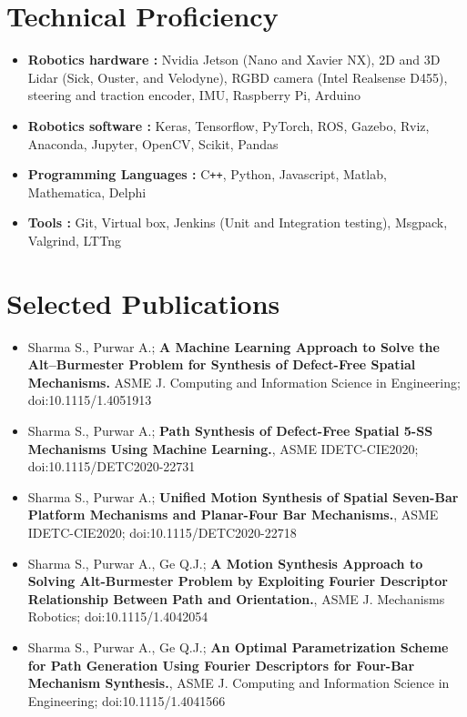 \documentclass[letterpaper,10pt]{article}
\newcommand{\resumeSection}[1]{
\vspace{-12pt}
\section{\textbf{#1}}
}
\newcommand{\resumeItemListStart}{
\vspace{-6pt}
\begin{itemize}[leftmargin=14pt]
}
\newcommand{\resumeItemListEnd}{
\vspace{+6pt}
\end{itemize}
}
\newcommand{\resumeItem}[1]{
  \item\small{
      {#1 \vspace{-7pt}
      }
  }
}
\begin{document}
\resumeSection{Technical Proficiency}
	\vspace{+7pt}
	\resumeItemListStart
	\resumeItem{\textbf{Robotics hardware :}  Nvidia Jetson (Nano and Xavier NX), 2D and 3D Lidar (Sick, Ouster, and Velodyne), RGBD camera (Intel Realsense D455), steering and traction encoder, IMU, Raspberry Pi, Arduino}
	\resumeItem{\textbf{Robotics software :} Keras, Tensorflow, PyTorch, ROS, Gazebo, Rviz, Anaconda, Jupyter, OpenCV, Scikit, Pandas}
	\resumeItem{\textbf{Programming Languages :} C\texttt{++}, Python, Javascript, Matlab, Mathematica, Delphi}
	\resumeItem{\textbf{Tools :} Git, Virtual box, Jenkins (Unit and Integration testing), Msgpack, Valgrind, LTTng}
	\resumeItemListEnd


\resumeSection{Selected Publications}
\vspace{+7pt}
\resumeItemListStart
\resumeItem{Sharma S., Purwar A.; \textbf{A Machine Learning Approach to Solve the Alt–Burmester Problem for Synthesis of Defect-Free Spatial Mechanisms.} ASME J. Computing and Information Science in Engineering; doi:10.1115/1.4051913}
\resumeItem{Sharma S., Purwar A.; \textbf{Path Synthesis of Defect-Free Spatial 5-SS Mechanisms Using Machine Learning.}, ASME IDETC-CIE2020; doi:10.1115/DETC2020-22731}
\resumeItem{Sharma S., Purwar A.; \textbf{Unified Motion Synthesis of Spatial Seven-Bar Platform Mechanisms and Planar-Four Bar Mechanisms.}, ASME IDETC-CIE2020; doi:10.1115/DETC2020-22718}
\resumeItem{Sharma S., Purwar A., Ge Q.J.; \textbf{A Motion Synthesis Approach to Solving Alt-Burmester Problem by Exploiting Fourier Descriptor Relationship Between Path and Orientation.}, ASME J. Mechanisms Robotics; doi:10.1115/1.4042054}
\resumeItem{Sharma S., Purwar A., Ge Q.J.; \textbf{An Optimal Parametrization Scheme for Path Generation Using Fourier Descriptors for Four-Bar Mechanism Synthesis.}, ASME J. Computing and Information Science in Engineering; doi:10.1115/1.4041566}
\resumeItemListEnd
\end{document}
